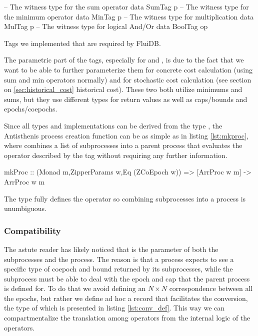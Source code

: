 \begin{code}
\begin{haskellcode}
-- The witness type for the sum operator
data SumTag p
-- The witness type for the minimum operator
data MinTag p
-- The witness type for multiplication
data MulTag p
-- The witness type for logical And/Or
data BoolTag op
\end{haskellcode}
  \caption{\label{lst:tag_types}Tags we implemented that are required
    by FluiDB.}
\end{code}

The parametric part of the tags, especially for  and
, is due to the fact that we want to be able to further
parameterize them for concrete cost calculation (using sum and min
operators normally) and for stochastic cost calculation (see section
on \ref{sec:historical_cost} historical cost). These two both utilize
minimums and sums, but they use different types for return values as
well as caps/bounds and epochs/coepochs.

Since all types and implementations can be derived from the
 type , the Antisthenis process creation
function can be as simple as in listing \ref{lst:mkproc}, where
 combines a list of subprocesses into a parent process
that evaluates the operator described by the tag  without
requiring any further information.

\begin{code}
\begin{haskellcode}
mkProc
  :: (Monad m,ZipperParams w,Eq (ZCoEpoch w)) => [ArrProc w m] -> ArrProc w m
\end{haskellcode}
\label{lst:mkproc}
\caption{The type  fully defines the operator so combining
  subprocesses into a process is unumbiguous.}
\end{code}

\subsubsection{Compatibility}

The astute reader has likely noticed that  is the parameter of
both the subprocesses and the process. The reason is that a process
expects to see a specific type of coepoch and bound returned by its
subprocesses, while the subprocess must be able to deal with the epoch
and cap that the parent process is defined for. To do that we avoid
defining an \(N \times N\) correspondence between all the epochs, but
rather we define ad hoc a record that facilitates the conversion, the
type of which is presented in listing \ref{lst:conv_def}. This way we
can compartmentalize the translation among operators from the internal
logic of the operators.

